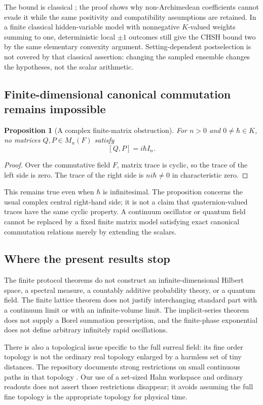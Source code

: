 \documentclass[11pt,oneside]{article}
\numberwithin{equation}{section}
\theoremstyle{plain}
\newtheorem{proposition}[theorem]{Proposition}
\theoremstyle{definition}
\theoremstyle{remark}
\begin{document}
The bound is classical \cite{Cirelson}; the proof shows why non-Archimedean coefficients cannot evade it while the same positivity and compatibility assumptions are retained. In a finite classical hidden-variable model with nonnegative $K$-valued weights summing to one, deterministic local $\pm1$ outcomes still give the CHSH bound two by the same elementary convexity argument. Setting-dependent postselection is not covered by that classical assertion: changing the sampled ensemble changes the hypotheses, not the scalar arithmetic.

\subsection{Finite-dimensional canonical commutation remains impossible}
\begin{proposition}[A complex finite-matrix obstruction]\label{prop:CCR}
For $n>0$ and $0\ne\hbar\in K$, no matrices $Q,P\in M_n(F)$ satisfy
\[
 [Q,P]=i\hbar I_n.
\]
\end{proposition}
\begin{proof}
Over the commutative field $F$, matrix trace is cyclic, so the trace of the left side is zero. The trace of the right side is $ni\hbar\ne0$ in characteristic zero.
\end{proof}

This remains true even when $\hbar$ is infinitesimal. The proposition concerns the usual complex central right-hand side; it is not a claim that quaternion-valued traces have the same cyclic property. A continuum oscillator or quantum field cannot be replaced by a fixed finite matrix model satisfying exact canonical commutation relations merely by extending the scalars.

\subsection{Where the present results stop}
The finite protocol theorems do not construct an infinite-dimensional Hilbert space, a spectral measure, a countably additive probability theory, or a quantum field. The finite lattice theorem does not justify interchanging standard part with a continuum limit or with an infinite-volume limit. The implicit-series theorem does not supply a Borel summation prescription, and the finite-phase exponential does not define arbitrary infinitely rapid oscillations.

There is also a topological issue specific to the full surreal field: its fine order topology is not the ordinary real topology enlarged by a harmless set of tiny distances. The repository documents strong restrictions on small continuous paths in that topology \cite{repo,repoPhysics}. Our use of a set-sized Hahn workspace and ordinary readouts does not assert those restrictions disappear; it avoids assuming the full fine topology is the appropriate topology for physical time.
\end{document}
